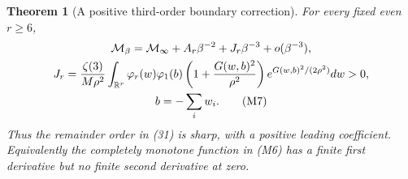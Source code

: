 \documentclass[11pt]{article}
\newtheorem{theorem}{Theorem}\newtheorem{lemma}[theorem]{Lemma}
\begin{document}
\begin{theorem}[A positive third-order boundary correction]
For every fixed even $r\ge6$,
\begin{gather}
 \mathcal M_\beta=\mathcal M_\infty+
             A_r\beta^{-2}+J_r\beta^{-3}+o(\beta^{-3}),\notag\\
 J_r=\frac{\zeta(3)}{M\rho^2}\int_{\mathbb R^r}
  \varphi_r(w)\varphi_1(b)
  \left(1+\frac{G(w,b)^2}{\rho^2}\right)
                 e^{G(w,b)^2/(2\rho^2)}dw>0,\notag\\
 b=-\sum_iw_i.                                           \tag{M7}
\end{gather}
Thus the remainder order in (31) is sharp, with a positive leading
coefficient. Equivalently the completely monotone function in (M6)
has a finite first derivative but no finite second derivative at zero.
\end{theorem}
\end{document}
